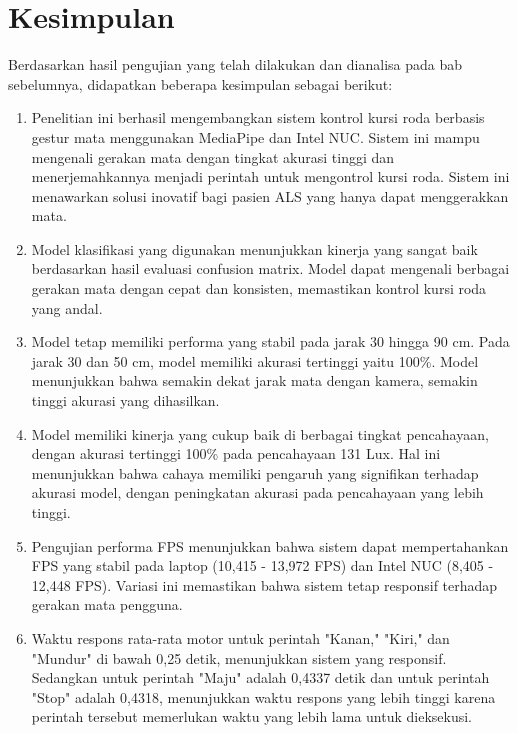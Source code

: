\section{Kesimpulan}
\label{sec:kesimpulan}


Berdasarkan hasil pengujian yang telah dilakukan dan dianalisa pada bab sebelumnya, didapatkan beberapa kesimpulan sebagai berikut:

\begin{enumerate}

  \item Penelitian ini berhasil mengembangkan sistem kontrol kursi roda berbasis gestur mata menggunakan MediaPipe dan Intel NUC. Sistem ini mampu mengenali gerakan mata dengan tingkat akurasi tinggi dan menerjemahkannya menjadi perintah untuk mengontrol kursi roda. Sistem ini menawarkan solusi inovatif bagi pasien ALS yang hanya dapat menggerakkan mata.

  \item Model klasifikasi yang digunakan menunjukkan kinerja yang sangat baik berdasarkan hasil evaluasi confusion matrix. Model dapat mengenali berbagai gerakan mata dengan cepat dan konsisten, memastikan kontrol kursi roda yang andal.

  \item Model tetap memiliki performa yang stabil pada jarak 30 hingga 90 cm. Pada jarak 30 dan 50 cm, model memiliki akurasi tertinggi yaitu 100\%. Model menunjukkan bahwa semakin dekat jarak mata dengan kamera, semakin tinggi akurasi yang dihasilkan.

  \item Model memiliki kinerja yang cukup baik di berbagai tingkat pencahayaan, dengan akurasi tertinggi 100\% pada pencahayaan 131 Lux. Hal ini menunjukkan bahwa cahaya memiliki pengaruh yang signifikan terhadap akurasi model, dengan peningkatan akurasi pada pencahayaan yang lebih tinggi.

  \item Pengujian performa FPS menunjukkan bahwa sistem dapat mempertahankan FPS yang stabil pada laptop (10,415 - 13,972 FPS) dan Intel NUC (8,405 - 12,448 FPS). Variasi ini memastikan bahwa sistem tetap responsif terhadap gerakan mata pengguna.
  
  \item Waktu respons rata-rata motor untuk perintah "Kanan," "Kiri," dan "Mundur" di bawah 0,25 detik, menunjukkan sistem yang responsif. Sedangkan untuk perintah "Maju" adalah 0,4337 detik dan untuk perintah "Stop" adalah 0,4318, menunjukkan waktu respons yang lebih tinggi karena perintah tersebut memerlukan waktu yang lebih lama untuk dieksekusi.
  

\end{enumerate}

